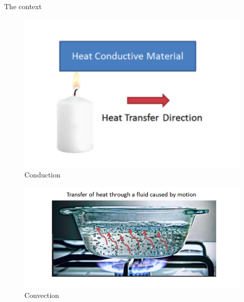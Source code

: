 \begin{frame}[allowframebreaks]{The context}
\begin{minipage}{0.30\linewidth}
    \begin{figure}
        \centering
        \includegraphics[width=1.2\linewidth]{images/enkf/conduction.png}
        \caption{Conduction}
    \end{figure}
\end{minipage} \;
\begin{minipage}{0.30\linewidth}
    \begin{figure}
        \centering
        \includegraphics[width=1.2\linewidth]{images/enkf/convection.png}
        \caption{Convection}
    \end{figure}
\end{minipage}
\begin{minipage}{0.35\linewidth}
    \begin{figure}
        \centering

\end{figure}
\end{minipage}
\end{frame}
